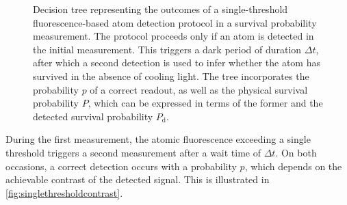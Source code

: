 \documentclass[../Thesis-IJspeert.tex]{subfiles}
\begin{document}
\begin{figure}[t!]
	\caption[Decision tree representing the outcomes of a single-threshold fluorescence-based atom detection protocol in a survival probability measurement]{Decision tree representing the outcomes of a single-threshold fluorescence-based atom detection protocol in a survival probability measurement. The protocol proceeds only if an atom is detected in the initial measurement. This triggers a dark period of duration $\Delta t$, after which a second detection is used to infer whether the atom has survived in the absence of cooling light. The tree incorporates the probability $p$ of a correct readout, as well as the physical survival probability $P$, which can be expressed in terms of the former and the detected survival probability $P_\mathrm{d}$.}
	\label{fig:decisiontree} 
\end{figure}
During the first measurement, the atomic fluorescence exceeding a single threshold triggers a second measurement after a wait time of $\Delta t$. On both occasions, a correct detection occurs with a probability $p$, which depends on the achievable contrast of the detected signal. This is illustrated in \autoref{fig:singlethresholdcontrast}.
\end{document}
